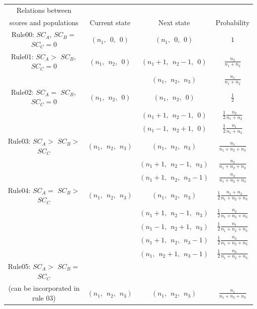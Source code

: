 \documentclass[12pt]{article}
\begin{document}
\begin{center}
    

\begin{tabular}{|c|c|c|c|}
 \hline
 Relations between \\scores and populations & Current state & Next state & Probability \\ 
 \hline
Rule00: $SC_A$, $SC_B=$ $SC_C=0$ & $(n_1,\ \ 0,\ \ 0)$ & $(n_1,\ \ 0,\ \ 0)$ & $1$ \\
 \hline
Rule01: $SC_A>$ $SC_B,$ $SC_C=0$ & $(n_1,\ \ n_2,\ \ 0)$ & $(n_1+1,\ \ n_2-1,\ \ 0)$ & $\frac{n_2}{n_1+n_2}$ \\
 
 &  & $(n_1,\ \ n_2,\ \ n_3)$ & $\frac{n_1}{n_1+n_2}$ \\
 \hline
Rule02: $SC_A=$ $SC_B,$ $SC_C=0$ & $(n_1,\ \ n_2,\ \ 0)$ & $(n_1,\ \ n_2,\ \ 0)$ & $\frac{1}{2}$ \\
 
 &  & $(n_1+1,\ \ n_2-1,\ \ 0)$ & $\frac{1}{2}\frac{n_2}{n_1+n_2}$ \\
 
 &  & $(n_1-1,\ \ n_2+1,\ \ 0)$ & $\frac{1}{2}\frac{n_1}{n_1+n_2}$ \\
 \hline
Rule03: $SC_A>$ $SC_B>$ $SC_C$ & $(n_1,\ \ n_2,\ \ n_3)$ & $(n_1,\ \ n_2,\ \ n_3)$ & $\frac{n_1}{n_1+n_2+n_3}$ \\

 &  & $(n_1+1,\ \ n_2-1,\ \ n_3)$ & $\frac{n_2}{n_1+n_2+n_3}$ \\

 &  & $(n_1+1,\ \ n_2,\ \ n_3-1)$ & $\frac{n_3}{n_1+n_2+n_3}$ \\
 \hline
Rule04: $SC_A=$ $SC_B>$ $SC_C$ & $(n_1,\ \ n_2,\ \ n_3)$ & $(n_1,\ \ n_2,\ \ n_3)$ & $\frac{1}{2}\frac{n_1+n_2}{n_1+n_2+n_3}$ \\

 &  & $(n_1+1,\ \ n_2-1,\ \ n_3)$ & $\frac{1}{2}\frac{n_2}{n_1+n_2+n_3}$ \\

 &  & $(n_1-1,\ \ n_2+1,\ \ n_3)$ & $\frac{1}{2}\frac{n_1}{n_1+n_2+n_3}$ \\

 &  & $(n_1+1,\ \ n_2,\ \ n_3-1)$ & $\frac{1}{2}\frac{n_3}{n_1+n_2+n_3}$ \\

 &  & $(n_1,\ \ n_2+1,\ \ n_3-1)$ & $\frac{1}{2}\frac{n_3}{n_1+n_2+n_3}$ \\
 \hline
Rule05: $SC_A>$ $SC_B=$ $SC_C$ \\ (can be incorporated in rule 03) & $(n_1,\ \ n_2,\ \ n_3)$ & $(n_1,\ \ n_2,\ \ n_3)$ & $\frac{n_1}{n_1+n_2+n_3}$ \\


\end{tabular}
\end{center}
\end{document}
